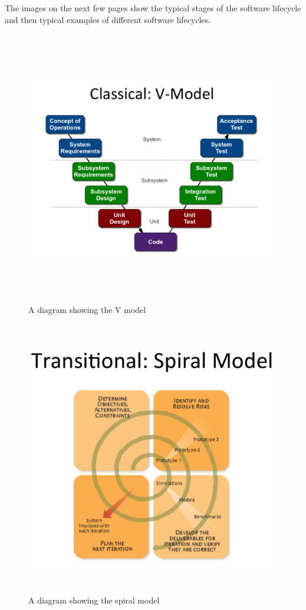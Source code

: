 \documentclass{report}
\begin{document}
The images on the next few pages show the typical stages of the software lifecycle and then typical examples of different software lifecycles.

\begin{figure}[h]
\begin{center} 
    \includegraphics[scale=0.6,width = 15cm, height = 12cm]{images/VModel.pdf}
    \caption{A diagram showing the V model}
\end{center}
\end{figure}

\begin{figure}[h]
\begin{center} 
    \includegraphics[scale=0.8,width = 15cm, height = 12cm]{images/Spiral.pdf}
    \caption{A diagram showing the spiral model}
\end{center}
\end{figure}
\end{document}
